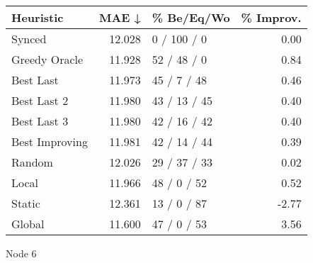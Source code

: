 \begin{tabular}{lrlr}
\toprule
\textbf{Heuristic} & \textbf{MAE ↓} & \textbf{\% Be/Eq/Wo} & \textbf{\% Improv.} \\
\midrule
            Synced &         12.028 &          0 / 100 / 0 &                0.00 \\
     Greedy Oracle &         11.928 &          52 / 48 / 0 &                0.84 \\
         Best Last &         11.973 &          45 / 7 / 48 &                0.46 \\
       Best Last 2 &         11.980 &         43 / 13 / 45 &                0.40 \\
       Best Last 3 &         11.980 &         42 / 16 / 42 &                0.40 \\
    Best Improving &         11.981 &         42 / 14 / 44 &                0.39 \\
            Random &         12.026 &         29 / 37 / 33 &                0.02 \\
             Local &         11.966 &          48 / 0 / 52 &                0.52 \\
            Static &         12.361 &          13 / 0 / 87 &               -2.77 \\
            Global &         11.600 &          47 / 0 / 53 &                3.56 \\
\bottomrule
\end{tabular}
\caption{Node 6}
\label{tab:ds_iid_lr05_le1_bs4_6}
